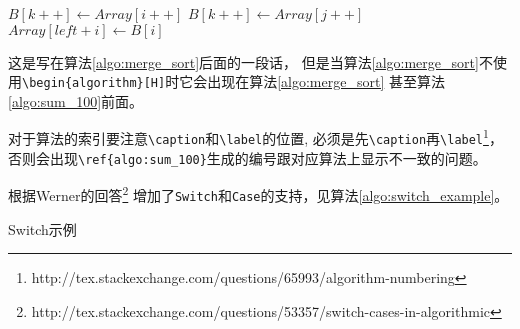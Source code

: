 \begin{algorithm}
\begin{algorithmic}[1]
    \State $B[k++] \gets Array[i++]$
  \EndWhile
    \State $B[k++] \gets Array[j++]$
  \EndWhile
    \State $Array[left + i] \gets B[i]$
  \EndFor
  \State {}
\EndFunction
\end{algorithmic}
\end{algorithm}

这是写在算法\ref{algo:merge_sort}后面的一段话，
但是当算法\ref{algo:merge_sort}不使用\verb+\begin{algorithm}[H]+时它会出现在算法\ref{algo:merge_sort}
甚至算法\ref{algo:sum_100}前面。

对于算法的索引要注意\verb+\caption+和\verb+\label+的位置, 
必须是先\verb+\caption+再\verb+\label+\footnote{http://tex.stackexchange.com/questions/65993/algorithm-numbering}，
否则会出现\verb+\ref{algo:sum_100}+生成的编号跟对应算法上显示不一致的问题。

根据Werner的回答\footnote{http://tex.stackexchange.com/questions/53357/switch-cases-in-algorithmic}
增加了\verb+Switch+和\verb+Case+的支持，见算法\ref{algo:switch_example}。

\begin{algorithm}
\caption{Switch示例}
\label{algo:switch_example}
\begin{algorithmic}[1]
    \EndCase
    \EndCase
    \Default
    \EndDefault
  \EndSwitch
\end{algorithmic}
\end{algorithm}
